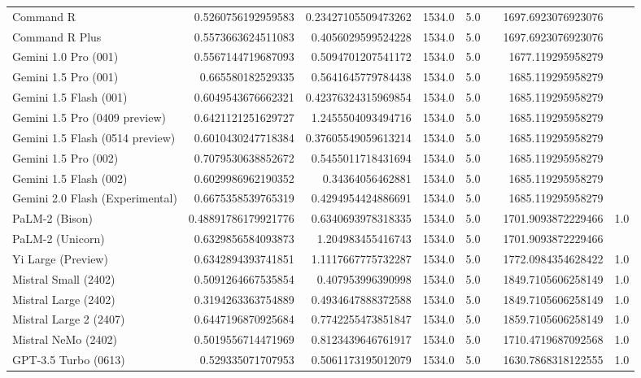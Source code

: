 \begin{table}[htp]
{\begin{tabular}{lrrrrrrr}
Command R & 0.5260756192959583 & 0.23427105509473262 & 1534.0 & 5.0 &  & 1697.6923076923076 &  \\
Command R Plus & 0.5573663624511083 & 0.4056029599524228 & 1534.0 & 5.0 &  & 1697.6923076923076 &  \\
Gemini 1.0 Pro (001) & 0.5567144719687093 & 0.5094701207541172 & 1534.0 & 5.0 &  & 1677.119295958279 &  \\
Gemini 1.5 Pro (001) & 0.665580182529335 & 0.5641645779784438 & 1534.0 & 5.0 &  & 1685.119295958279 &  \\
Gemini 1.5 Flash (001) & 0.6049543676662321 & 0.42376324315969854 & 1534.0 & 5.0 &  & 1685.119295958279 &  \\
Gemini 1.5 Pro (0409 preview) & 0.6421121251629727 & 1.2455504093494716 & 1534.0 & 5.0 &  & 1685.119295958279 &  \\
Gemini 1.5 Flash (0514 preview) & 0.6010430247718384 & 0.37605549059613214 & 1534.0 & 5.0 &  & 1685.119295958279 &  \\
Gemini 1.5 Pro (002) & 0.7079530638852672 & 0.5455011718431694 & 1534.0 & 5.0 &  & 1685.119295958279 &  \\
Gemini 1.5 Flash (002) & 0.6029986962190352 & 0.34364056462881 & 1534.0 & 5.0 &  & 1685.119295958279 &  \\
Gemini 2.0 Flash (Experimental) & 0.6675358539765319 & 0.4294954424886691 & 1534.0 & 5.0 &  & 1685.119295958279 &  \\
PaLM-2 (Bison) & 0.48891786179921776 & 0.6340693978318335 & 1534.0 & 5.0 &  & 1701.9093872229466 & 1.0 \\
PaLM-2 (Unicorn) & 0.6329856584093873 & 1.204983455416743 & 1534.0 & 5.0 &  & 1701.9093872229466 &  \\
Yi Large (Preview) & 0.6342894393741851 & 1.1117667775732287 & 1534.0 & 5.0 &  & 1772.0984354628422 & 1.0 \\
Mistral Small (2402) & 0.5091264667535854 & 0.407953996390998 & 1534.0 & 5.0 &  & 1849.7105606258149 & 1.0 \\
Mistral Large (2402) & 0.3194263363754889 & 0.4934647888372588 & 1534.0 & 5.0 &  & 1849.7105606258149 & 1.0 \\
Mistral Large 2 (2407) & 0.6447196870925684 & 0.7742255473851847 & 1534.0 & 5.0 &  & 1859.7105606258149 & 1.0 \\
Mistral NeMo (2402) & 0.5019556714471969 & 0.8123439646761917 & 1534.0 & 5.0 &  & 1710.4719687092568 & 1.0 \\
GPT-3.5 Turbo (0613) & 0.529335071707953 & 0.5061173195012079 & 1534.0 & 5.0 &  & 1630.7868318122555 & 1.0 \\

\end{tabular}}
\end{table}
